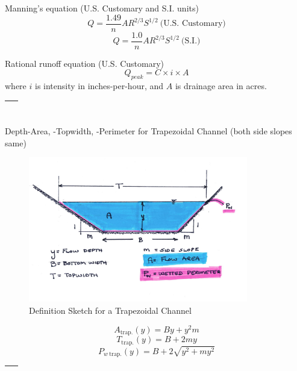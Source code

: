 \documentclass[11pt]{article}
\begin{document}
Manning's equation (U.S. Customary and S.I. units)
\begin{equation}
Q=\frac{1.49}{n} A R^{2/3} S^{1/2}~\text{(U.S. Customary)}
\end{equation}
\begin{equation}
Q=\frac{1.0}{n} A R^{2/3} S^{1/2}~\text{(S.I.)}
\end{equation}

Rational runoff equation (U.S. Customary)
\begin{equation}
Q_{peak}=C \times i \times A
\end{equation}
where $i$ is intensity in inches-per-hour, and $A$ is drainage area in acres.

\begin{tabular}{p{6in}}
~\\ \hline
\end{tabular}

Depth-Area, -Topwidth, -Perimeter for Trapezoidal Channel (both side slopes same)
\begin{figure}[h!] %
   \centering
   \includegraphics[height=2.5in]{TrapezoidChannelUS.jpg} 
   \caption{Definition Sketch for a Trapezoidal Channel}
   \label{fig:TrapezoidChannelUS.jpg}
\end{figure}

\begin{equation}
A_{\text{trap.}}(y) = B y + {y^2}{m}
\end{equation}
\begin{equation}
T_{\text{trap.}}(y) = B + 2 {m}{y}
\end{equation}
\begin{equation}
P_{w~\text{trap.}}(y) = B+2\sqrt{y^2 + my^2}
\end{equation}
\clearpage

\begin{tabular}{p{6in}}
~\\ \hline
\end{tabular}
\end{document}
